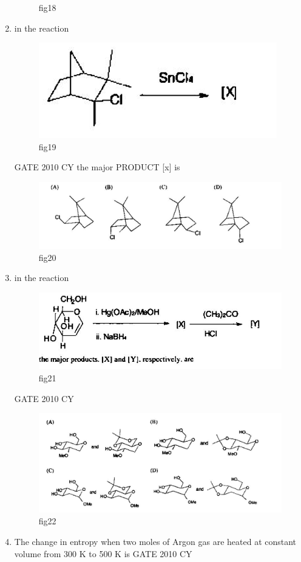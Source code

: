 \documentclass[journal,12pt,onecolumn]{IEEEtran}
\theoremstyle{remark}
\begin{document}
\begin{enumerate}
\begin{figure}[H]
    \caption{fig18}
    \label{fig:figs/Q.37.1.png}
\end{figure}
\item 
in the reaction
\begin{figure}[H]
    \centering
    \includegraphics[width=0.5\linewidth]{figs/Q.38.png}
    \caption{fig19}
    \label{fig:figs/Q.38.png}
\end{figure}
\hfill{GATE 2010 CY}
the major PRODUCT [x] is
\begin{figure}[H]
    \centering
    \includegraphics[width=0.80\linewidth]{figs/Q.38.1.png}
    \caption{fig20}
    \label{fig:figs/Q.38.1.png}
\end{figure}
\item in the reaction
\begin{figure}[H]
    \centering
    \includegraphics[width=0.75\linewidth]{figs/Q.39.png}
    \caption{fig21}
    \label{fig:figs/Q.39.png}
\end{figure}
\hfill{GATE 2010 CY}
\begin{figure}[H]
    \centering
    \includegraphics[width=1\linewidth]{figs/Q.39.1.png}
    \caption{fig22}
    \label{fig:figs/Q.39.1.png}
\end{figure}
\item The change in entropy when two moles of Argon gas are heated at constant volume from 300 K to 500 K is
\hfill{GATE 2010 CY}


\end{enumerate}
\end{document}

